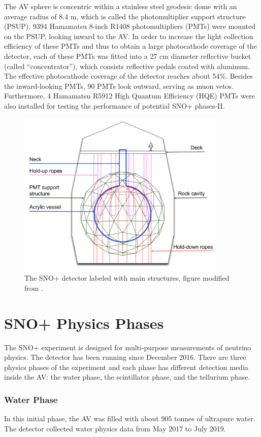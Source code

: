 The AV sphere is concentric within a stainless steel geodesic dome with an average radius of 8.4 m, which is called the photomultiplier support structure (PSUP). 9394 Hamamatsu 8-inch R1408 photomultipliers (PMTs) were mounted on the PSUP, looking inward to the AV. In order to increase the light collection efficiency of these PMTs and thus to obtain a large photocathode coverage of the detector, each of these PMTs was fitted into a 27 cm diameter reflective bucket (called ``concentrator''), which consists reflective pedals coated with aluminum. The effective photocathode coverage of the detector reaches about 54\%\cite{whitepaper}. Besides the inward-looking PMTs, 90 PMTs look outward, serving as muon vetos. Furthermore, 4 Hamamatsu R5912 High Quantum Efficiency (HQE) PMTs were also installed for testing the performance of potential SNO+ phases-II\cite{stringer2019sensitivity}. 

\begin{figure}[htbp]
	\centering
	\includegraphics[width=10cm]{SNOPdetector.png}
	\caption{The SNO+ detector labeled with main structures, figure modified from \cite{jones2011background}.}
	\label{snopdetector}
\end{figure}

\section{SNO+ Physics Phases}
The SNO+ experiment is designed for multi-purpose measurements of neutrino physics. The detector has been running since December 2016. There are three physics phases of the experiment and each phase has different detection media inside the AV: the water phase, the scintillator phase, and the tellurium phase\cite{whitepaper}. 

\subsubsection{Water Phase} 
In this initial phase, the AV was filled with about 905 tonnes of ultrapure water. The detector collected water physics data from May 2017 to July 2019.

